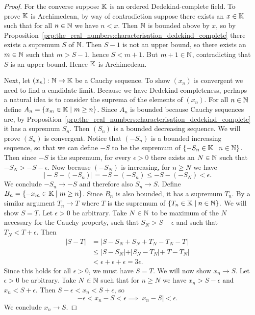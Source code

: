 \documentclass[../main.tex]{subfiles}
\begin{document}
\begin{proof}
    For the converse suppose $\mathbb{K}$ is an ordered Dedekind-complete field. To prove $\mathbb{K}$ is Archimedean, by way of contradiction suppose there exists an $x\in\mathbb{K}$ such that for all $n\in\mathbb{N}$ we have $n<x$. Then $\mathbb{N}$ is bounded above by $x$, so by Proposition~\ref{prp:the_real_numbers:characterisation_dedekind_complete} there exists a supremum $S$ of $\mathbb{N}$. Then $S-1$ is not an upper bound, so there exists an $m\in\mathbb{N}$ such that $m>S-1$, hence $S<m+1$. But $m+1\in\mathbb{N}$, contradicting that $S$ is an upper bound. Hence $\mathbb{K}$ is Archimedean.

    Next, let $(x_n):\mathbb{N}\to\mathbb{K}$ be a Cauchy sequence. To show $(x_n)$ is convergent we need to find a candidate limit. Because we have Dedekind-completeness, perhaps a natural idea is to consider the suprema of the elements of $(x_n)$. For all $n\in\mathbb{N}$ define $A_n=\{x_m\in\mathbb{K}\mid m\geq n\}$. Since $A_n$ is bounded because Cauchy sequences are, by Proposition~\ref{prp:the_real_numbers:characterisation_dedekind_complete} it has a supremum $S_n$. Then $(S_n)$ is a bounded decreasing sequence. We will prove $(S_n)$ is convergent. Notice that $(-S_n)$ is a bounded increasing sequence, so that we can define $-S$ to be the supremum of $\{-S_n\in\mathbb{K}\mid n\in\mathbb{N}\}$. Then since $-S$ is the supremum, for every $\epsilon>0$ there exists an $N\in\mathbb{N}$ such that $-S_N>-S-\epsilon$. Now because $(-S_N)$ is increasing, for $n\geq N$ we have
    \begin{equation*}
        \vert-S-(-S_n)\vert=-S-(-S_n)\leq-S-(-S_N)<\epsilon.
    \end{equation*}
    We conclude $-S_n\to-S$ and therefore also $S_n\to S$. Define $B_n=\{-x_m\in\mathbb{K}\mid m\geq n\}$. Since $B_n$ is also bounded, it has a supremum $T_n$. By a similar argument $T_n\to T$ where $T$ is the supremum of $\{T_n\in\mathbb{K}\mid n\in\mathbb{N}\}$. We will show $S=T$. Let $\epsilon>0$ be arbitrary. Take $N\in\mathbb{N}$ to be maximum of the $N$ necessary for the Cauchy property, such that $S_N>S-\epsilon$ and such that $T_N<T+\epsilon$. Then
    \begin{align*}
        \vert S-T\vert & =\vert S-S_N+S_N+T_N-T_N-T\vert \\
        & \leq\vert S-S_N\vert+\vert S_N-T_N\vert+\vert T-T_N\vert \\
        & <\epsilon+\epsilon+\epsilon=3\epsilon.
    \end{align*}
    Since this holds for all $\epsilon>0$, we must have $S=T$. We will now show $x_n\to S$. Let $\epsilon>0$ be arbitrary. Take $N\in\mathbb{N}$ such that for $n\geq N$ we have $x_n>S-\epsilon$ and $x_n<S+\epsilon$. Then $S-\epsilon<x_n<S+\epsilon$, so
    \begin{equation*}
        -\epsilon<x_n-S<\epsilon\implies\vert x_n-S\vert<\epsilon.
    \end{equation*}
    We conclude $x_n\to S$.
\end{proof}
\end{document}
